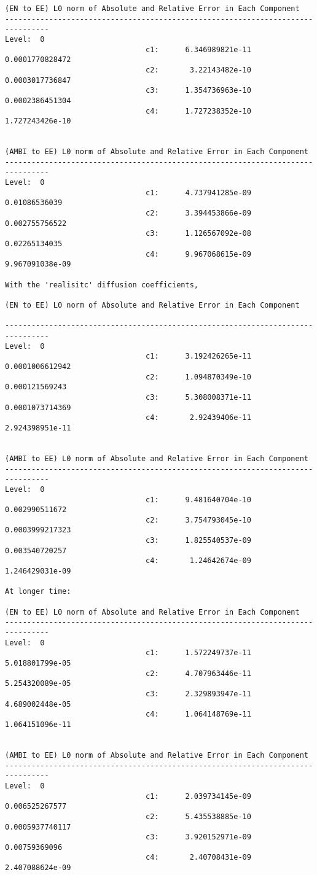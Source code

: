 \documentclass[final]{siamltex}
\begin{document}
\begin{verbatim}
(EN to EE) L0 norm of Absolute and Relative Error in Each Component
--------------------------------------------------------------------------------
Level:  0
                                c1:      6.346989821e-11     0.0001770828472
                                c2:       3.22143482e-10     0.0003017736847
                                c3:      1.354736963e-10     0.0002386451304
                                c4:      1.727238352e-10     1.727243426e-10


(AMBI to EE) L0 norm of Absolute and Relative Error in Each Component
--------------------------------------------------------------------------------
Level:  0
                                c1:      4.737941285e-09       0.01086536039
                                c2:      3.394453866e-09      0.002755756522
                                c3:      1.126567092e-08       0.02265134035
                                c4:      9.967068615e-09     9.967091038e-09

With the 'realisitc' diffusion coefficients,

(EN to EE) L0 norm of Absolute and Relative Error in Each Component

--------------------------------------------------------------------------------
Level:  0
                                c1:      3.192426265e-11     0.0001006612942
                                c2:      1.094870349e-10      0.000121569243
                                c3:      5.308008371e-11     0.0001073714369
                                c4:       2.92439406e-11     2.924398951e-11


(AMBI to EE) L0 norm of Absolute and Relative Error in Each Component
--------------------------------------------------------------------------------
Level:  0
                                c1:      9.481640704e-10      0.002990511672
                                c2:      3.754793045e-10     0.0003999217323
                                c3:      1.825540537e-09      0.003540720257
                                c4:       1.24642674e-09     1.246429031e-09

At longer time:

(EN to EE) L0 norm of Absolute and Relative Error in Each Component
--------------------------------------------------------------------------------
Level:  0
                                c1:      1.572249737e-11     5.018801799e-05
                                c2:      4.707963446e-11     5.254320089e-05
                                c3:      2.329893947e-11     4.689002448e-05
                                c4:      1.064148769e-11     1.064151096e-11


(AMBI to EE) L0 norm of Absolute and Relative Error in Each Component
--------------------------------------------------------------------------------
Level:  0
                                c1:      2.039734145e-09      0.006525267577
                                c2:      5.435538885e-10     0.0005937740117
                                c3:      3.920152971e-09       0.00759369096
                                c4:       2.40708431e-09     2.407088624e-09
\end{verbatim}
\end{document}
